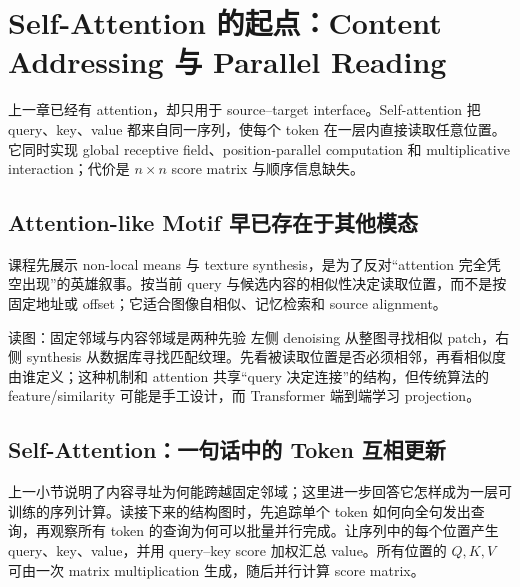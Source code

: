 \section{Self-Attention 的起点：Content Addressing 与 Parallel Reading}

上一章已经有 attention，却只用于 source--target interface。Self-attention 把 query、key、value 都来自同一序列，使每个 token 在一层内直接读取任意位置。它同时实现 global receptive field、position-parallel computation 和 multiplicative interaction；代价是 $n\times n$ score matrix 与顺序信息缺失。

\subsection{Attention-like Motif 早已存在于其他模态}

课程先展示 non-local means 与 texture synthesis，是为了反对“attention 完全凭空出现”的英雄叙事。按当前 query 与候选内容的相似性决定读取位置，而不是按固定地址或 offset；它适合图像自相似、记忆检索和 source alignment。


\begin{knowledgebox}{读图：固定邻域与内容邻域是两种先验}
左侧 denoising 从整图寻找相似 patch，右侧 synthesis 从数据库寻找匹配纹理。先看被读取位置是否必须相邻，再看相似度由谁定义；这种机制和 attention 共享“query 决定连接”的结构，但传统算法的 feature/similarity 可能是手工设计，而 Transformer 端到端学习 projection。
\end{knowledgebox}

\subsection{Self-Attention：一句话中的 Token 互相更新}

上一小节说明了内容寻址为何能跨越固定邻域；这里进一步回答它怎样成为一层可训练的序列计算。读接下来的结构图时，先追踪单个 token 如何向全句发出查询，再观察所有 token 的查询为何可以批量并行完成。让序列中的每个位置产生 query、key、value，并用 query--key score 加权汇总 value。所有位置的 $Q,K,V$ 可由一次 matrix multiplication 生成，随后并行计算 score matrix。


